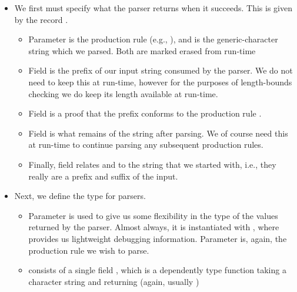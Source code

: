 \documentclass[11pt]{article}
\begin{document}
\begin{itemize}
\item We first must specify what the parser returns when it succeeds.
This is given by the record .

\begin{itemize}
\item Parameter  is the production rule (e.g.,
), and  is the generic-character
string which we parsed.
Both are marked erased from run-time

\item Field  is the prefix of our input string consumed by
the parser.
We do not need to keep this at run-time, however for the purposes of
length-bounds checking we do keep its length  available
at run-time.

\item Field  is a proof that the prefix conforms to the
production rule .

\item Field  is what remains of the string after parsing.
We of course need this at run-time to continue parsing any subsequent
production rules.

\item Finally, field  relates  and
 to the string  that we started with,
i.e., they really are a prefix and suffix of the input.
\end{itemize}

\item Next, we define the type  for parsers.
\begin{itemize}
\item Parameter  is used to give us some flexibility in the type
of the values returned by the parser.
Almost always, it is instantiated with
\AgdaSpace{}\AgdaSpace{},
where  provides us lightweight debugging
information.
Parameter  is, again, the production rule we wish to parse.

\item {} consists of a single field ,
which is a dependently type function taking a character string
 and returning
\AgdaSpace{}\AgdaSymbol{(}\AgdaSpace{}\AgdaSpace{}\AgdaSymbol{)}
(again, usually \AgdaSpace{}\AgdaSymbol{(}\AgdaSpace{}\AgdaSymbol{(}\AgdaSpace{}\AgdaSpace{}\AgdaSymbol{)}\AgdaSymbol{)})
\end{itemize}
\end{itemize}
\end{document}
